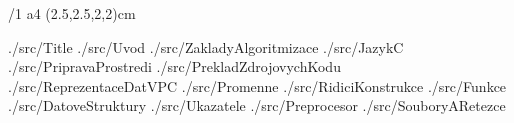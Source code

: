 

\cslang
\typosize[12/16]
\margins/1 a4 (2.5,2.5,2,2)cm


\def\rootpath{./src/}
\def\imgpath{./img/}

 {\rootpath Title}
 {\rootpath Uvod}
 {\rootpath ZakladyAlgoritmizace}
 {\rootpath JazykC}
 {\rootpath PripravaProstredi}
 {\rootpath PrekladZdrojovychKodu}
 {\rootpath ReprezentaceDatVPC}
 {\rootpath Promenne}
 {\rootpath RidiciKonstrukce}
 {\rootpath Funkce}
 {\rootpath DatoveStruktury}
 {\rootpath Ukazatele}
 {\rootpath Preprocesor}
 {\rootpath SouboryARetezce}

\bye

